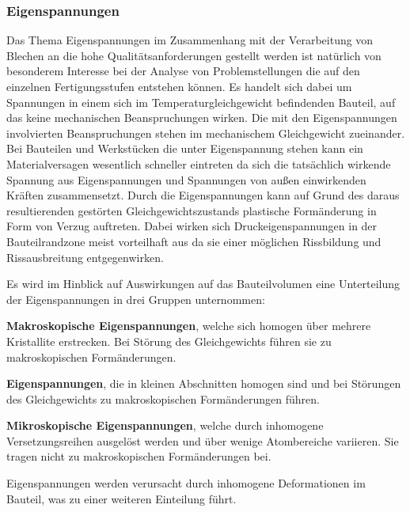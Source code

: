 \documentclass[12pt,a4paper,parskip,twoside,BCOR5mm,headsepline]{scrartcl}
\begin{document}
\begin{description*}
{\subsubsection{Eigenspannungen}
Das Thema Eigenspannungen im Zusammenhang mit der Verarbeitung von Blechen an die hohe Qualitätsanforderungen gestellt werden ist natürlich von besonderem Interesse bei der Analyse von Problemstellungen die auf den einzelnen Fertigungsstufen entstehen können. Es handelt sich dabei um Spannungen in einem sich im Temperaturgleichgewicht befindenden Bauteil, auf das keine mechanischen Beanspruchungen wirken. Die mit den Eigenspannungen involvierten  Beanspruchungen stehen im mechanischem Gleichgewicht zueinander. Bei Bauteilen und Werkstücken die unter Eigenspannung stehen kann ein Materialversagen wesentlich schneller eintreten da sich die tatsächlich wirkende Spannung aus Eigenspannungen und Spannungen von außen einwirkenden Kräften zusammensetzt. Durch die Eigenspannungen kann auf Grund des daraus resultierenden gestörten Gleichgewichtszustands plastische Formänderung in Form von Verzug auftreten.
Dabei wirken sich Druckeigenspannungen in der Bauteilrandzone meist vorteilhaft aus da sie einer möglichen Rissbildung und Rissausbreitung entgegenwirken.


Es wird im Hinblick auf Auswirkungen auf das Bauteilvolumen eine Unterteilung der Eigenspannungen in drei Gruppen unternommen:
\begin{enumerate*}
\item \textbf{Makroskopische Eigenspannungen}, welche sich homogen über mehrere Kristallite erstrecken. Bei Störung des Gleichgewichts führen sie zu makroskopischen Formänderungen.
\item \textbf{Eigenspannungen}, die in kleinen Abschnitten homogen sind und bei Störungen des Gleichgewichts zu makroskopischen Formänderungen führen.
\item \textbf{Mikroskopische Eigenspannungen}, welche durch inhomogene Versetzungsreihen ausgelöst werden und über wenige Atombereiche variieren. Sie tragen nicht zu makroskopischen Formänderungen bei. 


\end{enumerate*}

Eigenspannungen werden verursacht durch inhomogene Deformationen im Bauteil, was zu einer weiteren Einteilung führt.

}
\end{description*}
\end{document}
